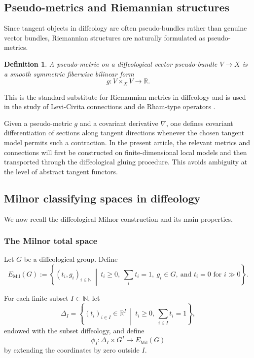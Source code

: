 \documentclass[11pt]{amsart}
\newtheorem{definition}[theorem]{Definition}
\begin{document}
\subsection{Pseudo-metrics and Riemannian structures}

Since tangent objects in diffeology are often pseudo-bundles rather than genuine vector bundles, Riemannian structures are naturally formulated as pseudo-metrics.

\begin{definition}
A \emph{pseudo-metric} on a diffeological vector pseudo-bundle \(V\to X\) is a smooth symmetric fiberwise bilinear form
\[
g:V\times_X V\to\mathbb R.
\]
\end{definition}

This is the standard substitute for Riemannian metrics in diffeology and is used in the study of Levi-Civita connections and de Rham-type operators \cite{Pervova2017,GW2020}.

Given a pseudo-metric \(g\) and a covariant derivative \(\nabla\), one defines covariant differentiation of sections along tangent directions whenever the chosen tangent model permits such a contraction. In the present article, the relevant metrics and connections will first be constructed on finite-dimensional local models and then transported through the diffeological gluing procedure. This avoids ambiguity at the level of abstract tangent functors.

\subsection{Milnor classifying spaces in diffeology}

We now recall the diffeological Milnor construction and its main properties.

\subsubsection{The Milnor total space}

Let \(G\) be a diffeological group. Define
\[
E_{\mathrm{Mil}}(G):=
\left\{(t_i,g_i)_{i\in\mathbb N}\ \middle|\
t_i\ge 0,\ \sum_i t_i=1,\ g_i\in G,\ \text{and }t_i=0\text{ for }i\gg 0
\right\}.
\]

For each finite subset \(I\subset \mathbb N\), let
\[
\Delta_I=\left\{(t_i)_{i\in I}\in \mathbb R^I\ \middle|\ t_i\ge 0,\ \sum_{i\in I}t_i=1\right\},
\]
endowed with the subset diffeology, and define
\[
\phi_I:\Delta_I\times G^I\to E_{\mathrm{Mil}}(G)
\]
by extending the coordinates by zero outside \(I\).
\end{document}
